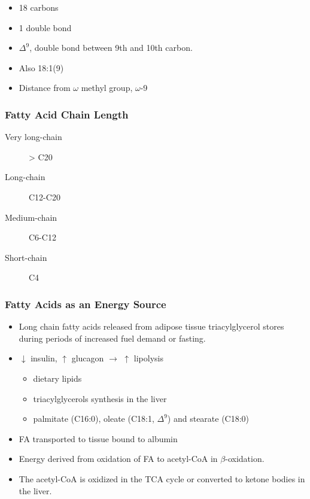 \documentclass{scrartcl}
\begin{document}
\begin{itemize}
\item 18 carbons
\item 1 double bond
\item \(\Delta^{\text{9}}\), double bond between 9th and 10th carbon.
\item Also 18:1(9)
\item Distance from \(\omega\) methyl group, \(\omega\)-9
\end{itemize}

\subsubsection{Fatty Acid Chain Length}
\label{sec:org283fbd4}

\begin{description}
\item[{Very long-chain}] > C20
\item[{Long-chain}] C12-C20
\item[{Medium-chain}] C6-C12
\item[{Short-chain}] C4
\end{description}

\subsubsection{Fatty Acids as an Energy Source}
\label{sec:org004ca62}

\begin{itemize}
\item Long chain fatty acids released from adipose tissue triacylglycerol
stores during periods of increased fuel demand or fasting.
\item \(\downarrow\) insulin, \(\uparrow\) glucagon \(\to\) \(\uparrow\) lipolysis
\begin{itemize}
\item dietary lipids
\item triacylglycerols synthesis in the liver
\item palmitate (C16:0), oleate (C18:1, \(\Delta^{\text{9}}\)) and stearate (C18:0)
\end{itemize}
\item FA transported to tissue bound to albumin
\item Energy derived from oxidation of FA to acetyl-CoA in \(\beta\)-oxidation.
\item The acetyl-CoA is oxidized in the TCA cycle or converted to ketone bodies in the liver.
\end{itemize}
\end{document}
